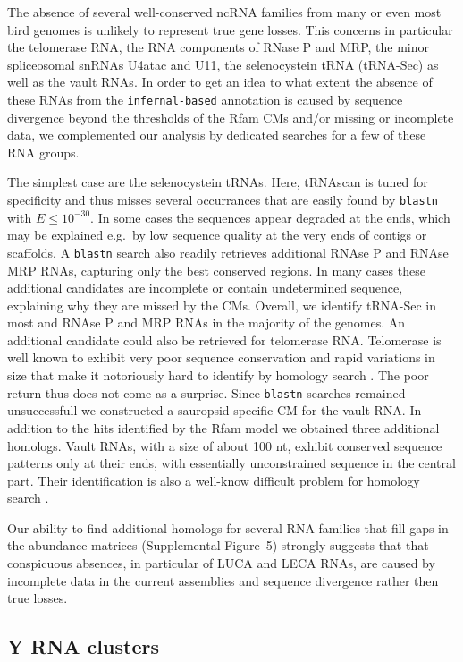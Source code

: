 \documentclass[10pt]{bmc_article}
\newenvironment{bmcformat}{\begin{raggedright}\baselineskip20pt\sloppy\setboolean{publ}{false}}{\end{raggedright}\baselineskip20pt\sloppy}
\begin{document}
\begin{bmcformat}
The absence of several well-conserved ncRNA families from many or even most
bird genomes is unlikely to represent true gene losses. This concerns in
particular the telomerase RNA, the RNA components of RNase P and MRP, the
minor spliceosomal snRNAs U4atac and U11, the selenocystein tRNA (tRNA-Sec)
as well as the vault RNAs. In order to get an idea to what extent the
absence of these RNAs from the \texttt{infernal-based} annotation is caused 
by sequence divergence beyond the thresholds of the Rfam CMs and/or 
missing or incomplete data, we complemented our analysis by dedicated
searches for a few of these RNA groups. 

The simplest case are the selenocystein tRNAs. Here, tRNAscan is tuned for
specificity and thus misses several occurrances that are easily found by
\texttt{blastn} with $E\le 10^{-30}$. In some cases the sequences appear
degraded at the ends, which may be explained e.g.\ by low sequence quality
at the very ends of contigs or scaffolds. A \texttt{blastn} search also
readily retrieves additional RNAse P and RNAse MRP RNAs, capturing only the
best conserved regions. In many cases these additional candidates are
incomplete or contain undetermined sequence, explaining why they are missed
by the CMs. Overall, we identify tRNA-Sec in most and RNAse P and MRP RNAs
in the majority of the genomes. An additional candidate could also be
retrieved for telomerase RNA. Telomerase is well known to exhibit very poor
sequence conservation and rapid variations in size that make it notoriously
hard to identify by homology search \cite{Xie:08a}. The poor return thus
does not come as a surprise. Since \texttt{blastn} searches remained
unsuccessfull we constructed a sauropsid-specific CM for the vault RNA. In
addition to the hits identified by the Rfam model we obtained three
additional homologs. Vault RNAs, with a size of about 100 nt, exhibit
conserved sequence patterns only at their ends, with essentially
unconstrained sequence in the central part. Their identification is also a
well-know difficult problem for homology search
\cite{Stadler:09b}. 

Our ability to find additional homologs for several RNA families that fill
gaps in the abundance matrices (Supplemental Figure~5)
strongly suggests that that conspicuous absences, in particular of LUCA and
LECA RNAs, are caused by incomplete data in the current assemblies and
sequence divergence rather then true losses.

\subsection*{Y RNA clusters} 


\end{bmcformat}
\end{document}
